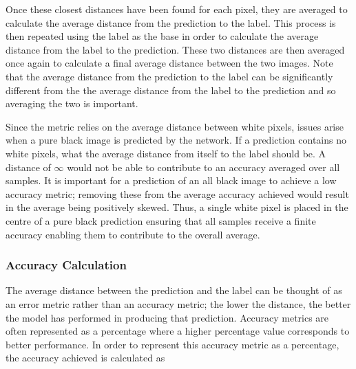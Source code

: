 Once these closest distances have been found for each pixel, they are averaged to calculate the average distance from the prediction to the label. This process is then repeated using the label as the base in order to calculate the average distance from the label to the prediction. These two distances are then averaged once again to calculate a final average distance between the two images. Note that the average distance from the prediction to the label can be significantly different from the the average distance from the label to the prediction and so averaging the two is important.

Since the metric relies on the average distance between white pixels, issues arise when a pure black image is predicted by the network. If a prediction contains no white pixels, what the average distance from itself to the label should be. A distance of $\infty$ would not be able to contribute to an accuracy averaged over all samples. It is important for a prediction of an all black image to achieve a low accuracy metric; removing these from the average accuracy achieved would result in the average being positively skewed. Thus, a single white pixel is placed in the centre of a pure black prediction ensuring that all samples receive a finite accuracy enabling them to contribute to the overall average.


\subsubsection{Accuracy Calculation}

The average distance between the prediction and the label can be thought of as an error metric rather than an accuracy metric; the lower the distance, the better the model has performed in producing that prediction. Accuracy metrics are often represented as a percentage where a higher percentage value corresponds to better performance. In order to represent this accuracy metric as a percentage, the accuracy achieved is calculated as

